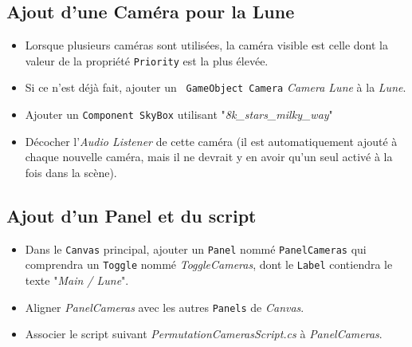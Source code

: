 \documentclass[a4paper,10pt]{article}
\newenvironment{solution}%
{\begin{tcolorbox}[breakable,colback=red!5!white,colframe=red!75!black,title=Solution]}%
{\end{tcolorbox}}
\begin{document}
\ifversionenseignant
\begin{solution}
\subsection{Ajout d'une Caméra pour la Lune}

\begin{itemize}
	\item Lorsque plusieurs caméras sont utilisées, la caméra visible est celle dont la valeur de la propriété \texttt{Priority} est la plus élevée.
	\item Si ce n'est déjà fait, ajouter un \texttt{ GameObject Camera} \textit{Camera Lune} à la \textit{Lune}.
	\item Ajouter un \texttt{Component SkyBox} utilisant "\textit{8k\_stars\_milky\_way}"
	\item Décocher l'\textit{Audio Listener} de cette caméra (il est automatiquement ajouté à chaque nouvelle caméra, mais il ne devrait y en avoir qu'un seul activé à la fois dans la scène).
\end{itemize}	

	
\subsection{Ajout d'un Panel et du script}
\begin{itemize}
	\item Dans le \texttt{Canvas} principal, ajouter un \texttt{Panel} nommé \texttt{PanelCameras} qui comprendra un \texttt{Toggle} nommé \textit{ToggleCameras}, dont le \texttt{Label} contiendra le texte "\textit{Main / Lune}".
	\item Aligner \textit{PanelCameras} avec les autres \texttt{Panels} de \textit{Canvas}.
	\item Associer le script suivant \textit{PermutationCamerasScript.cs} à \textit{PanelCameras}.
\end{itemize}	


\end{solution}
\end{document}
